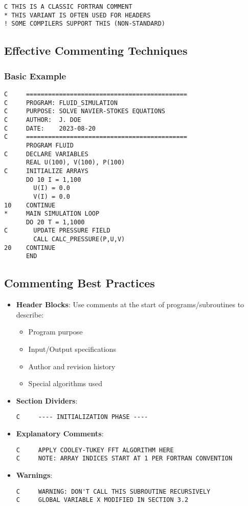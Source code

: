 \documentclass{book}
\begin{document}
\begin{verbatim}
C THIS IS A CLASSIC FORTRAN COMMENT
* THIS VARIANT IS OFTEN USED FOR HEADERS
! SOME COMPILERS SUPPORT THIS (NON-STANDARD)
\end{verbatim}

\subsection*{Effective Commenting Techniques}

\subsubsection*{Basic Example}
\begin{verbatim}
C     ============================================
C     PROGRAM: FLUID_SIMULATION
C     PURPOSE: SOLVE NAVIER-STOKES EQUATIONS
C     AUTHOR:  J. DOE
C     DATE:    2023-08-20
C     ============================================
      PROGRAM FLUID
C     DECLARE VARIABLES
      REAL U(100), V(100), P(100)
C     INITIALIZE ARRAYS
      DO 10 I = 1,100
        U(I) = 0.0
        V(I) = 0.0
10    CONTINUE
*     MAIN SIMULATION LOOP
      DO 20 T = 1,1000
C       UPDATE PRESSURE FIELD
        CALL CALC_PRESSURE(P,U,V)
20    CONTINUE
      END
\end{verbatim}

\subsection*{Commenting Best Practices}
\begin{itemize}
    \item \textbf{Header Blocks}: Use comments at the start of programs/subroutines to describe:
    \begin{itemize}
        \item Program purpose
        \item Input/Output specifications
        \item Author and revision history
        \item Special algorithms used
    \end{itemize}
    
    \item \textbf{Section Dividers}:
    \begin{verbatim}
C     ---- INITIALIZATION PHASE ----
    \end{verbatim}
    
    \item \textbf{Explanatory Comments}:
    \begin{verbatim}
C     APPLY COOLEY-TUKEY FFT ALGORITHM HERE
C     NOTE: ARRAY INDICES START AT 1 PER FORTRAN CONVENTION
    \end{verbatim}
    
    \item \textbf{Warnings}:
    \begin{verbatim}
C     WARNING: DON'T CALL THIS SUBROUTINE RECURSIVELY
C     GLOBAL VARIABLE X MODIFIED IN SECTION 3.2
    \end{verbatim}
\end{itemize}
\end{document}
